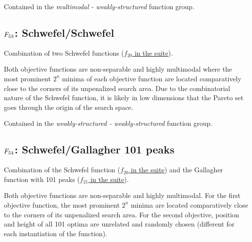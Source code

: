 Contained in the \emph{multimodal - weakly-structured} function group.



\subsection[\texorpdfstring{\protect\(F_{53}\protect\): Schwefel/Schwefel}{F53: Schwefel/Schwefel}]{\texorpdfstring{\protect\(F_{53}\protect\): Schwefel/Schwefel}{}}
\label{index:schwefel-schwefel}\label{index:f53}
Combination of two Schwefel functions (\href{https://coco.gforge.inria.fr/downloads/download16.00/bbobdocfunctions.pdf\#page=100}{\(f_{20}\) in the \bbob suite}).

Both objective functions are non-separable and highly multimodal where
the most prominent \(2^n\) minima of each objective function are
located comparatively close to the corners of its unpenalized search area.
Due to the combinatorial nature of the Schwefel function, it is likely
in low dimensions that the Pareto set goes through the origin of the
search space.

Contained in the \emph{weakly-structured - weakly-structured} function group.



\subsection[\texorpdfstring{\protect\(F_{54}\protect\): Schwefel/Gallagher 101 peaks}{F54: Schwefel/Gallagher 101 peaks}]{\texorpdfstring{\protect\(F_{54}\protect\): Schwefel/Gallagher 101 peaks}{}}
\label{index:f54}\label{index:schwefel-gallagher-101-peaks}
Combination of the Schwefel function (\href{https://coco.gforge.inria.fr/downloads/download16.00/bbobdocfunctions.pdf\#page=100}{\(f_{20}\) in the \bbob suite}) and the Gallagher function with
101 peaks (\href{https://coco.gforge.inria.fr/downloads/download16.00/bbobdocfunctions.pdf\#page=105}{\(f_{21}\) in the \bbob suite}).

Both objective functions are non-separable and highly multimodal.
For the first objective function, the most prominent \(2^n\) minima
are located comparatively close to the corners of its unpenalized search
area. For the second objective, position and height of all
101 optima are unrelated and randomly
chosen (different for each instantiation of the function).

